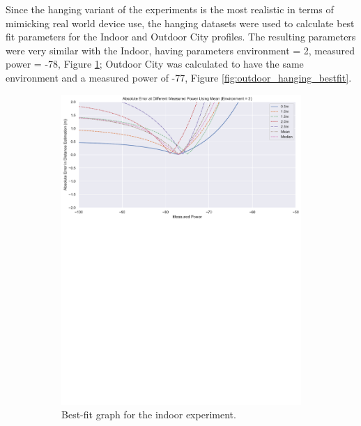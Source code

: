 \documentclass{l4proj}
\begin{document}
Since the hanging variant of the experiments is the most realistic in terms of mimicking real world device use, the hanging datasets were used to calculate best fit parameters for the Indoor and Outdoor City profiles. The resulting parameters were very similar with the Indoor, having parameters environment = 2, measured power = -78, Figure \ref{fig:indoor_hanging_bestfit}; Outdoor City was calculated to have the same environment and a measured power of -77, Figure \ref{fig:outdoor_hanging_bestfit}.

\begin{figure}[!htb]
    \centering
    \begin{subfigure}[b]{0.45\textwidth}
        \includegraphics[width=\textwidth]{images/indoor_hanging_bestfit.pdf}
        \caption{ Best-fit graph for the indoor experiment. }
        \label{fig:indoor_hanging_bestfit}
    \end{subfigure}
    ~
    \begin{subfigure}[b]{0.45\textwidth}

\end{subfigure}
\end{figure}
\end{document}
